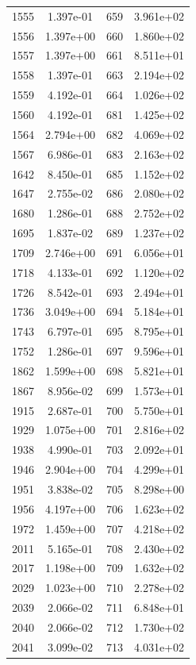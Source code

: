 \documentclass[12pt]{article}
\begin{document}
\begin{longtable}{@{}cccc@{}}
1555 & 1.397e-01 & 659 & 3.961e+02 \\
1556 & 1.397e+00 & 660 & 1.860e+02 \\
1557 & 1.397e+00 & 661 & 8.511e+01 \\
1558 & 1.397e-01 & 663 & 2.194e+02 \\
1559 & 4.192e-01 & 664 & 1.026e+02 \\
1560 & 4.192e-01 & 681 & 1.425e+02 \\
1564 & 2.794e+00 & 682 & 4.069e+02 \\
1567 & 6.986e-01 & 683 & 2.163e+02 \\
1642 & 8.450e-01 & 685 & 1.152e+02 \\
1647 & 2.755e-02 & 686 & 2.080e+02 \\
1680 & 1.286e-01 & 688 & 2.752e+02 \\
1695 & 1.837e-02 & 689 & 1.237e+02 \\
1709 & 2.746e+00 & 691 & 6.056e+01 \\
1718 & 4.133e-01 & 692 & 1.120e+02 \\
1726 & 8.542e-01 & 693 & 2.494e+01 \\
1736 & 3.049e+00 & 694 & 5.184e+01 \\
1743 & 6.797e-01 & 695 & 8.795e+01 \\
1752 & 1.286e-01 & 697 & 9.596e+01 \\
1862 & 1.599e+00 & 698 & 5.821e+01 \\
1867 & 8.956e-02 & 699 & 1.573e+01 \\
1915 & 2.687e-01 & 700 & 5.750e+01 \\
1929 & 1.075e+00 & 701 & 2.816e+02 \\
1938 & 4.990e-01 & 703 & 2.092e+01 \\
1946 & 2.904e+00 & 704 & 4.299e+01 \\
1951 & 3.838e-02 & 705 & 8.298e+00 \\
1956 & 4.197e+00 & 706 & 1.623e+02 \\
1972 & 1.459e+00 & 707 & 4.218e+02 \\
2011 & 5.165e-01 & 708 & 2.430e+02 \\
2017 & 1.198e+00 & 709 & 1.632e+02 \\
2029 & 1.023e+00 & 710 & 2.278e+02 \\
2039 & 2.066e-02 & 711 & 6.848e+01 \\
2040 & 2.066e-02 & 712 & 1.730e+02 \\
2041 & 3.099e-02 & 713 & 4.031e+02 \\

\bottomrule
\end{longtable}
\end{document}
